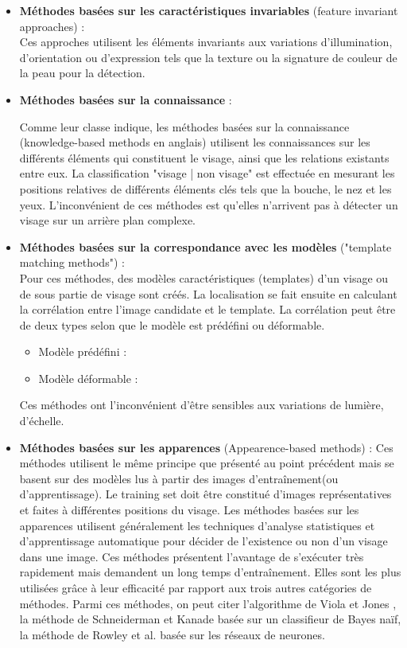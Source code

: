 \begin{itemize}
	\item \textbf{Méthodes basées sur les caractéristiques invariables} (feature invariant approaches) : \\
	Ces approches utilisent les éléments invariants aux variations d'illumination, d'orientation ou d'expression tels que la texture ou
la signature de couleur de la peau pour la détection.


	\item \textbf{Méthodes basées sur la connaissance} :
	
	Comme leur classe indique, les méthodes basées sur la connaissance (knowledge-based methods en anglais) utilisent les connaissances sur les différents éléments qui constituent le visage, ainsi que les relations existants entre eux. La classification "visage | non visage" est effectuée en mesurant les positions relatives de différents éléments clés tels que la bouche, le nez et les yeux. L'inconvénient de ces méthodes est qu'elles n'arrivent pas à détecter un visage sur un arrière plan complexe.
	
	
	\item \textbf{Méthodes basées sur la correspondance avec les modèles} ("template matching methods") :\\ 
	Pour ces méthodes, des modèles caractéristiques (templates) d'un visage ou de sous partie de visage sont créés. La localisation se fait ensuite en calculant la corrélation entre l'image candidate et le template. La corrélation peut être de deux types selon que le modèle est prédéfini ou déformable.
	
	\begin{itemize}
		\item Modèle prédéfini : 
		\item Modèle déformable : 
	\end{itemize}
	Ces méthodes ont l'inconvénient d'être sensibles aux variations de lumière, d'échelle.

\item\textbf{ Méthodes basées sur les apparences} (Appearence-based methods) : 
	Ces méthodes utilisent le même principe que présenté au point précédent mais se basent sur des modèles lus à partir des images d'entraînement(ou d'apprentissage). Le training set doit être constitué d'images représentatives et faites à différentes positions du visage. Les méthodes basées sur les apparences utilisent généralement les techniques d'analyse statistiques et d'apprentissage automatique pour décider de l'existence ou non d'un visage dans une image. Ces méthodes présentent l'avantage de s'exécuter très rapidement mais demandent un long temps d'entraînement. Elles sont les plus utilisées grâce à leur efficacité par rapport aux trois autres catégories de méthodes. Parmi ces méthodes, on peut citer l'algorithme de Viola et Jones \citep{VIO}, la méthode de Schneiderman et Kanade \citep{Kan} basée sur un classifieur de Bayes naïf, la méthode de Rowley et al. \citep{Row} basée sur les réseaux de neurones.
\end{itemize}
